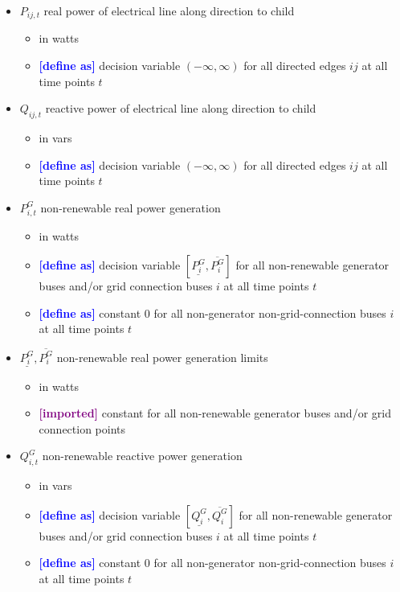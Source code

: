 \documentclass{article}
\newcommand{\lo}[1]{\underline{#1}}
\newcommand{\hi}[1]{\overline{#1}}
\newcommand{\define}{\textcolor{blue}{\textbf{[define as] }}}
\newcommand{\imported}{\textcolor{purple}{\textbf{[imported] }}}
\begin{document}
\begin{itemize}
\item $P_{ij,t}$ real power of electrical line along direction to child
  \begin{itemize}
    \item in watts
    \item \define decision variable $(-\infty, \infty)$ for all directed edges
      $ij$ at all time points $t$
  \end{itemize}

\item $Q_{ij,t}$ reactive power of electrical line along direction to child
  \begin{itemize}
    \item in vars
    \item \define decision variable $(-\infty, \infty)$ for all directed edges
      $ij$ at all time points $t$
  \end{itemize}

\item $P^G_{i,t}$ non-renewable real power generation
  \begin{itemize}
    \item in watts
    \item \define decision variable $[\lo{P^G_i}, \hi{P^G_i}]$ for all
      non-renewable generator buses and/or grid connection buses $i$ at all time
      points $t$
    \item \define constant $0$ for all non-generator non-grid-connection buses
      $i$ at all time points $t$
  \end{itemize}

\item $\lo{P^G_i}, \hi{P^G_i}$ non-renewable real power generation limits
  \begin{itemize}
  \item in watts
  \item \imported constant for all non-renewable generator buses and/or grid
    connection points
  \end{itemize}

\item $Q^G_{i,t}$ non-renewable reactive power generation
  \begin{itemize}
    \item in vars
    \item \define decision variable $[\lo{Q^G_i}, \hi{Q^G_i}]$ for all
      non-renewable generator buses and/or grid connection buses $i$ at all time
      points $t$
    \item \define constant $0$ for all non-generator non-grid-connection buses
      $i$ at all time points $t$
  \end{itemize}



\end{itemize}
\end{document}
